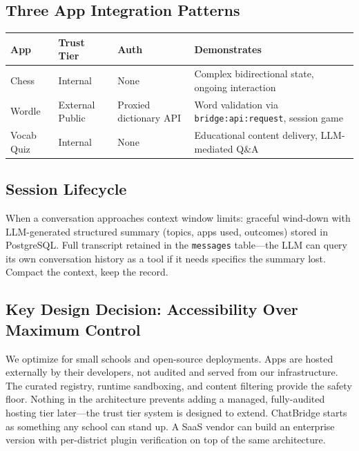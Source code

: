 \documentclass[11pt,letterpaper]{article}
\begin{document}
\subsection*{Three App Integration Patterns}

\begin{tabularx}{\textwidth}{l l l X}
\toprule
\textbf{App} & \textbf{Trust Tier} & \textbf{Auth} & \textbf{Demonstrates} \\
\midrule
Chess & Internal & None & Complex bidirectional state, ongoing interaction \\
Wordle & External Public & Proxied dictionary API & Word validation via \texttt{bridge:api:request}, session game \\
Vocab Quiz & Internal & None & Educational content delivery, LLM-mediated Q\&A \\
\bottomrule
\end{tabularx}

\subsection*{Session Lifecycle}

When a conversation approaches context window limits: graceful wind-down with
LLM-generated structured summary (topics, apps used, outcomes) stored in PostgreSQL.
Full transcript retained in the \texttt{messages} table---the LLM can query its own
conversation history as a tool if it needs specifics the summary lost. Compact the
context, keep the record.

\subsection*{Key Design Decision: Accessibility Over Maximum Control}

We optimize for small schools and open-source deployments. Apps are hosted externally
by their developers, not audited and served from our infrastructure. The curated
registry, runtime sandboxing, and content filtering provide the safety floor. Nothing
in the architecture prevents adding a managed, fully-audited hosting tier later---the
trust tier system is designed to extend. ChatBridge starts as something any school can
stand up. A SaaS vendor can build an enterprise version with per-district plugin
verification on top of the same architecture.

\end{document}
